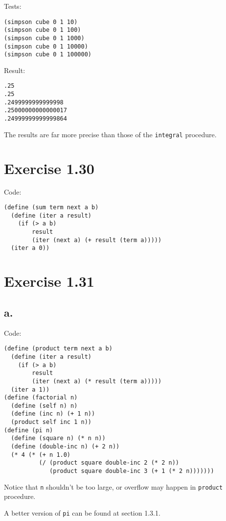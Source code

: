 \documentclass[../main.tex]{subfiles}
\begin{document}
Tests:

\begin{lstlisting}
(simpson cube 0 1 10)
(simpson cube 0 1 100)
(simpson cube 0 1 1000)
(simpson cube 0 1 10000)
(simpson cube 0 1 100000)
\end{lstlisting}

Result:

\begin{lstlisting}
.25
.25
.2499999999999998
.25000000000000017
.24999999999999864
\end{lstlisting}

The results are far more precise than
 those of the \lstinline{integral}
 procedure.

\section{Exercise 1.30}

Code:

\begin{lstlisting}
(define (sum term next a b)
  (define (iter a result)
    (if (> a b)
        result
        (iter (next a) (+ result (term a)))))
  (iter a 0))
\end{lstlisting}

\section{Exercise 1.31}

\subsection*{a.}

Code:

\begin{lstlisting}
(define (product term next a b)
  (define (iter a result)
    (if (> a b)
        result
        (iter (next a) (* result (term a)))))
  (iter a 1))
(define (factorial n)
  (define (self n) n)
  (define (inc n) (+ 1 n))
  (product self inc 1 n))
(define (pi n)
  (define (square n) (* n n))
  (define (double-inc n) (+ 2 n))
  (* 4 (* (+ n 1.0)
          (/ (product square double-inc 2 (* 2 n))
             (product square double-inc 3 (+ 1 (* 2 n)))))))
\end{lstlisting}

Notice that \lstinline{n} shouldn't be
 too large, or overflow may happen in
 \lstinline{product} procedure.

A better version of \lstinline{pi} can
 be found at section 1.3.1.
\end{document}
